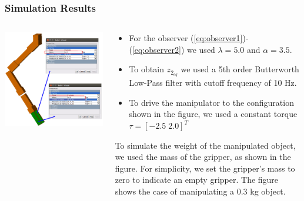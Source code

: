 \documentclass[9pt,spanish,aspectratio=1610]{beamer}
\begin{document}
\begin{frame}\frametitle{Simulation Results}
  \begin{columns}
    \begin{column}{0.45\textwidth}
      \includegraphics[width=\textwidth]{Figures/object_mass.png}
    \end{column}
    \begin{column}{0.55\textwidth}
      \begin{itemize}
      \item For the observer (\ref{eq:observer1})-(\ref{eq:observer2}) we used $\lambda=5.0$ and $\alpha=3.5$.
      \item To obtain $z_{2_{eq}}$ we used a 5th order Butterworth Low-Pass filter with cutoff frequency of 10 Hz.
      \item To drive the manipulator to the configuration shown in the figure, we used a constant torque $\tau=[-2.5\;2.0]^T$
      \end{itemize}
      To simulate the weight of the manipulated object, we used the mass of the gripper, as shown in the figure. For simplicity, we set the gripper's mass to zero to indicate an empty gripper. The figure shows the case of manipulating a 0.3 kg object.
    \end{column}
  \end{columns}
\end{frame}
\end{document}
